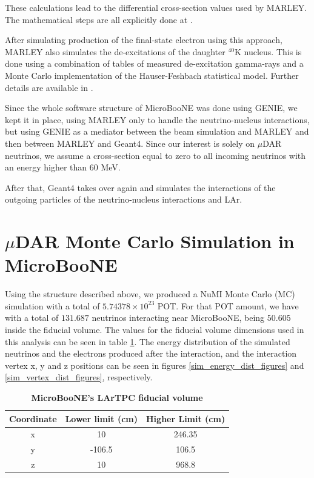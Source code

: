 These calculations lead to the differential cross-section values used by MARLEY. The mathematical steps are all explicitly done at \cite{Gardiner_thesis}. 

After simulating production of the final-state electron using this approach, MARLEY also simulates the de-excitations of the daughter $^{40}$K nucleus. This is done using a combination of tables of measured de-excitation gamma-rays and a Monte Carlo implementation of the Hauser-Feshbach statistical model. Further details are available in \cite{deexcitation-model}. 

Since the whole software structure of MicroBooNE was done using GENIE, we kept it in place, using MARLEY only to handle the neutrino-nucleus interactions, but using GENIE as a mediator between the beam simulation and MARLEY and then between MARLEY and Geant4. Since our interest is solely on $\mu$DAR neutrinos, we assume a cross-section equal to zero to all incoming neutrinos with an energy higher than $60$ MeV. 

After that, Geant4 takes over again and simulates the interactions of the outgoing particles of the neutrino-nucleus interactions and LAr. 

\section{$\mu$DAR Monte Carlo Simulation in MicroBooNE}

Using the structure described above, we produced a NuMI Monte Carlo (MC) simulation with a total of $5.74378 \times 10^{23}$ POT. For that POT amount, we have with a total of $131.687$ neutrinos interacting near MicroBooNE, being $50.605$ inside the fiducial volume. The values for the fiducial volume dimensions used in this analysis can be seen in table \ref{fiducial}. The energy distribution of the simulated neutrinos and the electrons produced after the interaction, and the interaction vertex x, y and z positions can be seen in figures \ref{sim_energy_dist_figures} and \ref{sim_vertex_dist_figures}, respectively.  

\begin{table}
	\begin{center}
		\begin{tabular}{ccc}
			\bottomrule
						 \textbf{Coordinate}	&	\textbf{Lower limit (cm)}	&	\textbf{Higher Limit (cm)}\\
			\toprule
			x &	10 & 246.35 \\ 
			y &	-106.5 & 106.5 \\
			z &	10 & 968.8 \\ 
			\toprule
		\end{tabular}
		\caption[MicroBooNE's LArTPC fiducial volume]{{\textbf{MicroBooNE's LArTPC fiducial volume}}}
		\label{fiducial}
	\end{center}
\end{table}


